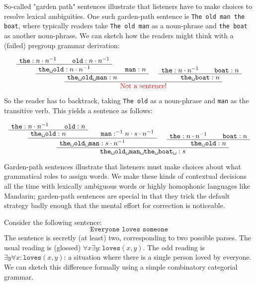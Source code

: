 \begin{fullwidth}
\begin{example}
So-called "garden path" sentences illustrate that listeners have to make choices to resolve lexical ambiguities. One such garden-path sentence is \texttt{The old man the boat}, where typically readers take \texttt{The old man} as a noun-phrase and \texttt{the boat} as another noun-phrase. We can sketch how the readers might think with a (failed) pregroup grammar derivation:

\[
\AxiomC{$\texttt{the} : n \cdot n^{-1}$}
\AxiomC{$\texttt{old} : n \cdot n^{-1}$}
\BinaryInfC{$\texttt{the\textvisiblespace old}: n \cdot n^{-1}$}
\AxiomC{$\texttt{man} : n$}
\BinaryInfC{$\texttt{the\textvisiblespace old\textvisiblespace man}: n$}
\AxiomC{$\texttt{the} : n \cdot n^{-1}$}
\AxiomC{$\texttt{boat} : n$}
\BinaryInfC{$\texttt{the\textvisiblespace boat}: n$}
\BinaryInfC{\textcolor{red}{Not a sentence!}}
\DisplayProof
\]

So the reader has to backtrack, taking \texttt{The old} as a noun-phrase and \texttt{man} as the transitive verb. This yields a sentence as follows:

\[
\AxiomC{$\texttt{the} : n \cdot n^{-1}$}
\AxiomC{$\texttt{old} : n$}
\BinaryInfC{$\texttt{the\textvisiblespace old}: n$}
\AxiomC{$\texttt{man} : ^{-1}n \cdot s \cdot n^{-1}$}
\BinaryInfC{$\texttt{the\textvisiblespace old\textvisiblespace man}: s \cdot n^{-1}$}
\AxiomC{$\texttt{the} : n \cdot n^{-1}$}
\AxiomC{$\texttt{boat} : n$}
\BinaryInfC{$\texttt{the\textvisiblespace old}: n$}
\BinaryInfC{$\texttt{the\textvisiblespace old\textvisiblespace man\textvisiblespace the\textvisiblespace boat\textvisiblespace}: s$}
\DisplayProof
\]

Garden-path sentences illustrate that listeners must make choices about what grammatical roles to assign words. We make these kinds of contextual decisions all the time with lexically ambiguous words or highly homophonic languages like Mandarin; garden-path sentences are special in that they trick the default strategy badly enough that the mental effort for correction is noticeable.
\end{example}

\begin{example}
Consider the following sentence:
\[\texttt{Everyone loves someone}\]
The sentence is secretly (at least) two, corresponding to two possible parses. The usual reading is (glossed) $\forall x \exists y : \texttt{loves}(x,y)$. The odd reading is $\exists y \forall x : \texttt{loves}(x,y)$: a situation where there is a single person loved by everyone. We can sketch this difference formally using a simple combinatory categorial grammar.


\end{example}
\end{fullwidth}

